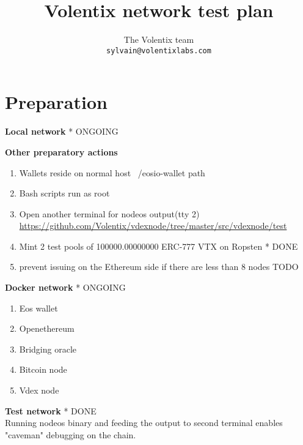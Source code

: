 \documentclass[]{article}
\title{Volentix network test plan}
\author{
		The Volentix team\\
	\texttt{sylvain@volentixlabs.com}
}
\begin{document}
\maketitle


\section{Preparation}

\textbf{Local network}  * {\color{green} ONGOING}


 \textbf{Other preparatory actions}
  		\begin{enumerate}

  		    \item Wallets reside on normal host ~/eosio-wallet path
		   \item Bash scripts run as root
		   	\item Open another terminal for nodeos output(tty 2)
  			\url{https://github.com/Volentix/vdexnode/tree/master/src/vdexnode/test} 
 		  \item Mint 2 test pools of 100000.00000000 ERC-777 VTX on Ropsten  * {\color{green} DONE}
		  \item prevent issuing on the Ethereum side if there are less than 8 nodes {\color{red} TODO}
		   
	 \end{enumerate}
   \textbf{Docker network}	  * {\color{yellow} ONGOING}
  \begin{enumerate}
  	\item Eos wallet
  	\item Openethereum
  	\item Bridging oracle
  	\item Bitcoin node
  	\item Vdex node
  \end{enumerate}
   \textbf{Test network}	  * {\color{green} DONE}\\
   Running nodeos binary and feeding the output to second terminal enables "caveman"
   debugging on the chain. 
   
\end{document}
